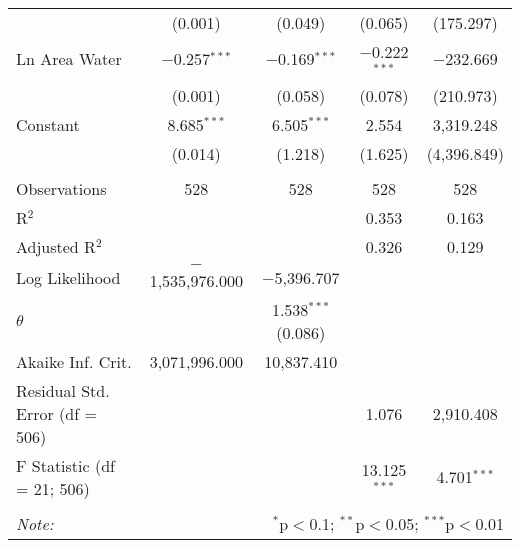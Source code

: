 \begin{table}[!htbp]
\begin{tabular}{@{\extracolsep{5pt}}lcccc}
  & (0.001) & (0.049) & (0.065) & (175.297) \\ 
  Ln Area Water & $-$0.257$^{***}$ & $-$0.169$^{***}$ & $-$0.222$^{***}$ & $-$232.669 \\ 
  & (0.001) & (0.058) & (0.078) & (210.973) \\ 
  Constant & 8.685$^{***}$ & 6.505$^{***}$ & 2.554 & 3,319.248 \\ 
  & (0.014) & (1.218) & (1.625) & (4,396.849) \\ 
 \hline \\[-1.8ex] 
Observations & 528 & 528 & 528 & 528 \\ 
R$^{2}$ &  &  & 0.353 & 0.163 \\ 
Adjusted R$^{2}$ &  &  & 0.326 & 0.129 \\ 
Log Likelihood & $-$1,535,976.000 & $-$5,396.707 &  &  \\ 
$\theta$ &  & 1.538$^{***}$  (0.086) &  &  \\ 
Akaike Inf. Crit. & 3,071,996.000 & 10,837.410 &  &  \\ 
Residual Std. Error (df = 506) &  &  & 1.076 & 2,910.408 \\ 
F Statistic (df = 21; 506) &  &  & 13.125$^{***}$ & 4.701$^{***}$ \\ 
\hline 
\hline \\[-1.8ex] 
\textit{Note:}  & \multicolumn{4}{r}{$^{*}$p$<$0.1; $^{**}$p$<$0.05; $^{***}$p$<$0.01} \\ 
\end{tabular} 
\end{table} 
